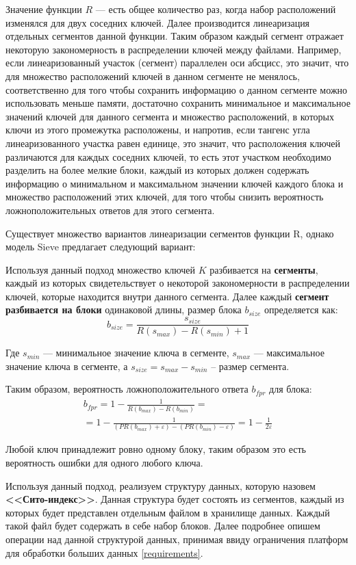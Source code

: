 Значение функции $R$ --- есть общее количество раз, когда набор расположений изменялся для двух соседних ключей. Далее производится линеаризация отдельных сегментов данной функции. Таким образом каждый сегмент отражает некоторую закономерность в распределении ключей между файлами. Например, если линеаризованный участок (сегмент) параллелен оси абсцисс, это значит, что для множество расположений ключей в данном сегменте не менялось, соответственно для того чтобы сохранить информацию о данном сегменте можно использовать меньше памяти, достаточно сохранить минимальное и максимальное значений ключей для данного сегмента и множество расположений, в которых ключи из этого промежутка расположены, и напротив, если тангенс угла линеаризованного участка равен единице, это значит, что расположения ключей различаются для каждых соседних ключей, то есть этот участком необходимо разделить на более мелкие блоки, каждый из которых должен содержать информацию о минимальном и максимальном значении ключей каждого блока и множество расположений этих ключей, для того чтобы снизить вероятность ложноположительных ответов для этого сегмента.

Существует множество вариантов линеаризации сегментов функции R, однако модель Sieve предлагает следующий вариант: 

Используя данный подход множество ключей $K$ разбивается на \textbf{сегменты}, каждый из которых свидетельствует о некоторой закономерности в распределении ключей, которые находится внутри данного сегмента. Далее каждый \textbf{сегмент разбивается на блоки} одинаковой длины, размер блока $b_{size}$ определяется как:
\begin{equation}\label{partition_size}
    b_{size} = \frac{s_{size}}{R(s_{max}) - R(s_{min}) + 1}
\end{equation}

Где $s_{min}$ --- минимальное значение ключа в сегменте, $s_{max}$ --- максимальное значение ключа в сегменте, а $s_{size} = s_{max} - s_{min}$ -- размер сегмента.

Таким образом, вероятность ложноположительного ответа $b_{fpr}$ для блока:
\begin{equation}\label{partition_fpr}
    \begin{gathered}
    b_{fpr} = 1 - \frac{1}{R(b_{max}) - R(b_{min})} =\\
    = 1 - \frac{1}{(PR(b_{max}) + \varepsilon) - (PR(b_{min}) - \varepsilon)} = 1 - \frac{1}{2\varepsilon}
    \end{gathered}
\end{equation}

Любой ключ принадлежит ровно одному блоку, таким образом это есть вероятность ошибки для одного любого ключа.

Используя данный подход, реализуем структуру данных, которую назовем \textbf{<<Сито-индекс>>}. Данная структура будет состоять из сегментов, каждый из которых будет представлен отдельным файлом в хранилище данных. Каждый такой файл будет содержать в себе набор блоков. Далее подробнее опишем операции над данной структурой данных, принимая ввиду ограничения платформ для обработки больших данных \ref{requirements}.

